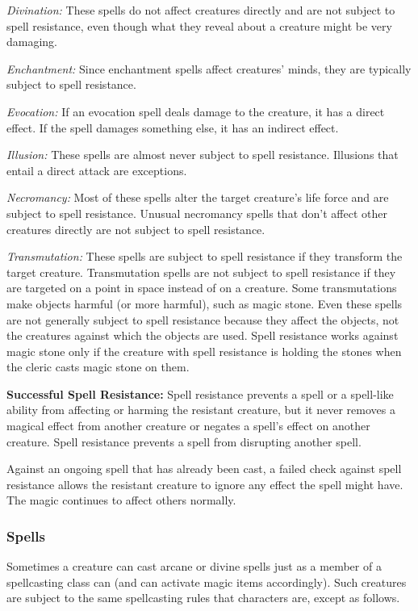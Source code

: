\textit{Divination:} These spells do not affect creatures directly and are not subject to spell resistance, even though what they reveal about a creature might be very damaging.

\textit{Enchantment:} Since enchantment spells affect creatures' minds, they are typically subject to spell resistance.

\textit{Evocation:} If an evocation spell deals damage to the creature, it has a direct effect. If the spell damages something else, it has an indirect effect.

\textit{Illusion:} These spells are almost never subject to spell resistance. Illusions that entail a direct attack are exceptions.

\textit{Necromancy:} Most of these spells alter the target creature's life force and are subject to spell resistance. Unusual necromancy spells that don't affect other creatures directly are not subject to spell resistance.

\textit{Transmutation:} These spells are subject to spell resistance if they transform the target creature. Transmutation spells are not subject to spell resistance if they are targeted on a point in space instead of on a creature. Some transmutations make objects harmful (or more harmful), such as magic stone. Even these spells are not generally subject to spell resistance because they affect the objects, not the creatures against which the objects are used. Spell resistance works against magic stone only if the creature with spell resistance is holding the stones when the cleric casts magic stone on them.

\textbf{Successful Spell Resistance:} Spell resistance prevents a spell or a spell-like ability from affecting or harming the resistant creature, but it never removes a magical effect from another creature or negates a spell's effect on another creature. Spell resistance prevents a spell from disrupting another spell.

Against an ongoing spell that has already been cast, a failed check against spell resistance allows the resistant creature to ignore any effect the spell might have. The magic continues to affect others normally.

\subsubsection{Spells}
Sometimes a creature can cast arcane or divine spells just as a member of a spellcasting class can (and can activate magic items accordingly). Such creatures are subject to the same spellcasting rules that characters are, except as follows.

